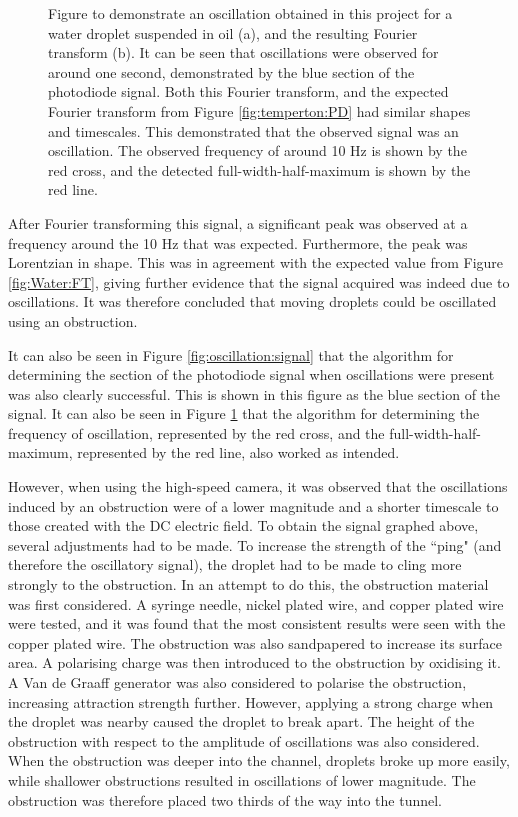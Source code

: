 \documentclass{physics_article_B}
\begin{document}
\begin{figure}[H]
\begin{subfigure}[b]{0.48\textwidth}
                \label{fig:oscillation:FT}
                \end{subfigure}
            \caption{Figure to demonstrate an oscillation obtained in this project for a water droplet suspended in oil (a), and the resulting Fourier transform (b). It can be seen that oscillations were observed for around one second, demonstrated by the blue section of the photodiode signal. Both this Fourier transform, and the expected Fourier transform from Figure \ref{fig:temperton:PD} had similar shapes and timescales. This demonstrated that the observed signal was an oscillation. The observed frequency of around 10 Hz is shown by the red cross, and the detected full-width-half-maximum is shown by the red line. }\label{fig:oscillation}
        \end{figure} 
        
        After Fourier transforming this signal, a significant peak was observed at a frequency around the 10 Hz that was expected. Furthermore, the peak was Lorentzian in shape. This was in agreement with the expected value from Figure \ref{fig:Water:FT}, giving further evidence that the signal acquired was indeed due to oscillations. It was therefore concluded that moving droplets could be oscillated using an obstruction.
        
        It can also be seen in Figure \ref{fig:oscillation:signal} that the algorithm for determining the section of the photodiode signal when oscillations were present was also clearly successful. This is shown in this figure as the blue section of the signal. It can also be seen in Figure \ref{fig:oscillation:FT} that the algorithm for determining the frequency of oscillation, represented by the red cross, and the full-width-half-maximum, represented by the red line, also worked as intended.
        
        However, when using the high-speed camera, it was observed that the oscillations induced by an obstruction were of a lower magnitude and a shorter timescale to those created with the DC electric field. To obtain the signal graphed above, several adjustments had to be made. To increase the strength of the ``ping" (and therefore the oscillatory signal), the droplet had to be made to cling more strongly to the obstruction. In an attempt to do this, the obstruction material was first considered. A syringe needle, nickel plated wire, and copper plated wire were tested, and it was found that the most consistent results were seen with the copper plated wire. The obstruction was also sandpapered to increase its surface area. A polarising charge was then introduced to the obstruction by oxidising it. A Van de Graaff generator was also considered to polarise the obstruction, increasing attraction strength further. However, applying a strong charge when the droplet was nearby caused the droplet to break apart. The height of the obstruction with respect to the amplitude of oscillations was also considered. When the obstruction was deeper into the channel, droplets broke up more easily, while shallower obstructions resulted in oscillations of lower magnitude. The obstruction was therefore placed two thirds of the way into the tunnel. 
        
\end{document}
